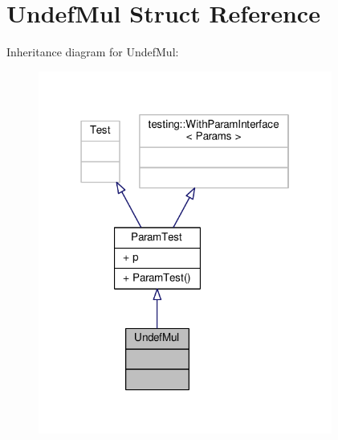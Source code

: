 \hypertarget{struct_undef_mul}{}\section{Undef\+Mul Struct Reference}
\label{struct_undef_mul}


Inheritance diagram for Undef\+Mul\+:
\nopagebreak
\begin{figure}[H]
\begin{center}
\leavevmode
\includegraphics[width=274pt]{struct_undef_mul__inherit__graph}
\end{center}
\end{figure}


